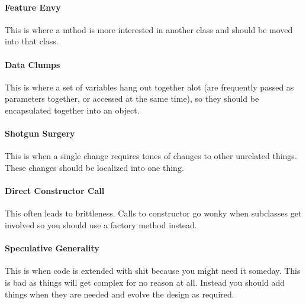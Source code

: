 \documentclass{article}
\begin{document}
\paragraph{Feature Envy} %
\label{par:feature_envy}
This is where a mthod is more interested in another class and should be moved into that class.

\paragraph{Data Clumps} %
\label{par:data_clumps}
This is where a set of variables hang out together alot (are frequently passed as parameters together, or accessed at the same time), so they should be encapsulated together into an object.

\paragraph{Shotgun Surgery} %
\label{par:shotgun_surgery}
This is when a single change requires tones of changes to other unrelated things. These changes should be localized into one thing.

\paragraph{Direct Constructor Call} %
\label{par:direct_constructor_call}
This often leads to brittleness. Calls to constructor go wonky when subclasses get involved so you should use a factory method instead.

\paragraph{Speculative Generality} %
\label{par:speculative_generality}
This is when code is extended with shit because you might need it someday. This is bad as things will get complex for no reason at all. Instead you should add things when they are needed and evolve the design as required.
\end{document}
